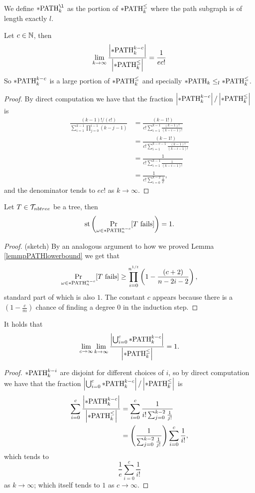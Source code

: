 \begin{defi}
We define $\pPATH_k^{\l}$ as the portion of $*\text{PATH}^\leq_k$ where the path subgraph is of length exactly $l$. 
\end{defi}


\begin{lemm}
Let $c\in \mathbb{N}$, then 
\[\lim_{k\to\infty}\frac{\left|{*\text{PATH}_k^{k-c}}\right|}{\left|{*\text{PATH}^\leq_k}\right|}=\frac{1}{ec!}\]
So $*\text{PATH}_k^{k-c}$ is a large portion of $*\text{PATH}^\leq_k$ and specially $*\text{PATH}_k\leq_l *\text{PATH}^\leq_k$.
\end{lemm}
\begin{proof}
By direct computation we have that the fraction $\left|{*\text{PATH}_k^{k-c}}\right|/\left|{*\text{PATH}^\leq_k}\right|$ is
\begin{align}
\frac{(k-1)!/(c!)}{\sum_{i=1}^{k-1}\prod_{j=0}^{i-1}(k-j-1)}&=\frac{(k-1!)}{c!\sum_{i=1}^{k-1}\frac{(k-1)!}{(k-i-1)!}}\\
&=\frac{(k-1!)}{c!\sum_{i=1}^{k-c-1}\frac{(k-1)!}{(k-i-1)!}}\\
&=\frac{1}{c!\sum_{i=1}^{k-1}\frac{1}{(k-i-1)!}}\\
&=\frac{1}{c!\sum_{i=0}^{k-2}\frac{1}{i!}},
\end{align}
and the denominator tends to $ec!$ as $k\to\infty$.
\end{proof}

\begin{lemm}\label{lemmpathnnc}
Let $T\in \mathcal{T}_{nbtree}$ be a tree, then
\[\text{st}\left(\Pr_{\omega\in*\text{PATH}_{n}^{n-c}}[\text{$T$ fails}]\right )=1.\]
\end{lemm}
\begin{proof}(sketch)
By an analogous argument to how we proved Lemma \ref{lemmpPATHlowerbound} we get that
\[\Pr_{\omega\in*\text{PATH}_{n}^{n-c}}[T\text{ fails}]\geq \prod_{i=0}^{n^{1/t}}\left(1-\frac{(c+2)}{n-2i-2}\right),\]
standard part of which is also $1$. The constant $c$ appears because there is a $(1-\frac{c}{m})$ chance of finding a degree $0$ in the induction step.
\end{proof}

\begin{lemm}\label{lemmpathmaj}
It holds that
\[\lim_{c\to\infty}\lim_{k\to\infty}\frac{\left|{\bigcup_{i=0}^c *\text{PATH}_k^{k-c}}\right|}{\left|{*\text{PATH}^\leq_k}\right|}=1.\]
\end{lemm}
\begin{proof}
$*\text{PATH}^{k-i}_k$ are disjoint for different choices of $i$, so by direct computation we have that the fraction $\left|{\bigcup_{i=0}^c *\text{PATH}_k^{k-c}}\right|/\left|{*\text{PATH}^\leq_k}\right|$ is
\begin{align}
\sum_{i=0}^{c} \frac{\left|{*\text{PATH}_k^{k-c}}\right|}{\left|{*\text{PATH}^\leq_k}\right|}&=\sum_{i=0}^{c}\frac{1}{i!\sum_{j=0}^{k-2}\frac{1}{j!}}\\
&=\left(\frac{1}{\sum_{j=0}^{k-2}\frac{1}{j!}}\right)\sum_{i=0}^{c}\frac{1}{i!},
\end{align}
which tends to \[\frac{1}{e}\sum_{i=0}^c\frac{1}{i!}\] as $k\to\infty$; which itself tends to $1$ as $c\to\infty$.
\end{proof}

